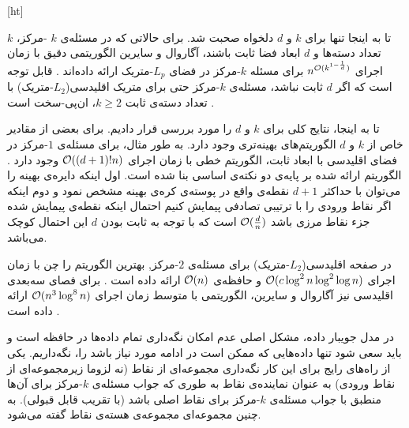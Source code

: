 [ht]

تا به اینجا  تنها برای $k$ و $d$ دلخواه صحبت شد. برای حالاتی که در مسئله‌ی $k$ -مرکز، $k$ تعداد دسته‌ها و $d$ ابعاد فضا ثابت باشند، آگاروال و سایرین الگوریتمی دقیق با زمان اجرای $n^{\mathcal{O}(k^{1 - \frac{1}{d}})}$ برای مسئله‌ $k$-مرکز در فضای $L_p$-متریک ارائه داده‌اند . قابل توجه است که اگر $d$ ثابت نباشد، مسئله‌ی $k$-مرکز حتی برای متریک اقلیدسی($L_2$-متریک) با تعداد دسته‌ی ثابت $k \geq 2$، ان‌پی-سخت است .

تا به اینجا، نتایج کلی برای $k$ و $d$ را مورد بررسی قرار دادیم. برای بعضی از مقادیر خاص از $k$ و $d$ الگوریتم‌های بهینه‌تری وجود دارد.  به طور مثال، برای مسئله‌ی $1$-مرکز در فضای اقلیدسی با ابعاد ثابت، الگوریتم خطی با زمان اجرای $\mathcal{O}((d+1)! n)$ وجود دارد . الگوریتم ارائه شده بر پایه‌ی دو نکته‌ی اساسی بنا شده است. اول اینکه دایره‌ی بهینه را می‌توان با حداکثر $d+1$ نقطه‌ی واقع در پوسته‌ی کره‌ی بهینه مشخص نمود و دوم اینکه اگر نقاط ورودی را با ترتیبی تصادفی پیمایش‌ کنیم احتمال اینکه نقطه‌ی پیمایش شده جزء نقاط مرزی باشد $\mathcal{O}(\frac{d}{n})$ است که با توجه به ثابت بودن $d$ این احتمال کوچک می‌باشد. 

در صفحه اقلیدسی‌($L_2$-متریک) برای مسئله‌ی $2$-مرکز, بهترین الگوریتم را چن   با زمان اجرای $\mathcal{O}(c \log^2{n} \log^2{\log{n}})$ و حافظه‌ی $\mathcal{O}(n)$ ارائه داده است . برای فصای سه‌بعدی اقلیدسی نیز آگاروال و سایرین، الگوریتمی با متوسط‌ زمان اجرای $\mathcal{O}(n^3\log^8{n})$ ارائه داده است .


در مدل جویبار داده، مشکل اصلی عدم امکان نگه‌داری تمام داده‌ها در حافظه است و باید سعی شود تنها داده‌هایی که ممکن است در ادامه مورد نیاز باشد را، نگه‌داریم. یکی از راه‌های رایج برای این کار نگه‌داری مجموعه‌ای از‌ نقاط (نه لزوما زیرمجموعه‌ای از نقاط‌ ورودی) به عنوان نماینده‌ی نقاط‌ به طوری که جواب مسئله‌ی $k$-مرکز برای آن‌ها منطبق‌ با جواب مسئله‌ی $k$-مرکز‌ برای نقاط‌ اصلی باشد (با تقریب قابل قبولی). به چنین مجموعه‌ای مجموعه‌ی هسته‌ی نقاط‌ گفته می‌شود. 

